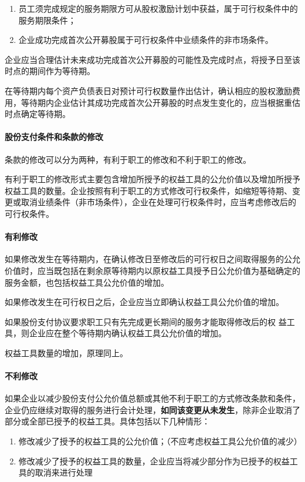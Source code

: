 \documentclass[UTF8,12pt]{ctexart}
\numberwithin{equation}{section} %
\numberwithin{figure}{section}
\numberwithin{table}{section}
\begin{document}
	\begin{enumerate}
		\item 员工须完成规定的服务期限方可从股权激励计划中获益，属于可行权条件中的服务期限条件；
		
		\item 企业成功完成首次公开募股属于可行权条件中业绩条件的非市场条件。
	\end{enumerate}

	企业应当合理估计未来成功完成首次公开募股的可能性及完成时点，将授予日至该时点的期间作为等待期。
	
	在等待期内每个资产负债表日对预计可行权数量作出估计，确认相应的股权激励费用，等待期内企业估计其成功完成首次公开募股的时点发生变化的，应当根据重估时点确定等待期。
	
	\paragraph{股份支付条件和条款的修改}
	条款的修改可以分为两种，有利于职工的修改和不利于职工的修改。
	
	有利于职工的修改形式主要包含增加所授予的权益工具的公允价值以及增加所授予权益工具的数量。企业按照有利于职工的方式修改可行权条件，如缩短等待期、变更或取消业绩条件（非市场条件），企业在处理可行权条件时，应当考虑修改后的可行权条件。
	
	\paragraph{有利修改}
	如果修改发生在等待期内，在确认修改日至修改后的可行权日之间取得服务的公允价值时，应当既包括在剩余原等待期内以原权益工具授予日公允价值为基础确定的服务金额，也包括权益工具公允价值的增加。
	
	如果修改发生在可行权日之后，企业应当立即确认权益工具公允价值的增加。
	
	如果股份支付协议要求职工只有先完成更长期间的服务才能取得修改后的权  益工具，则企业应在整个等待期内确认权益工具公允价值的增加。
	
	权益工具数量的增加，原理同上。
	
	\paragraph{不利修改}
	如果企业以减少股份支付公允价值总额或其他不利于职工的方式修改条款和条件，企业仍应继续对取得的服务进行会计处理，\textbf{如同该变更从未发生}，除非企业取消了部分或全部已授予的权益工具。具体包括以下几种情形：
	\begin{enumerate}
		\item 修改减少了授予的权益工具的公允价值；（不应考虑权益工具公允价值的减少）
		
		\item 修改减少了授予的权益工具的数量，企业应当将减少部分作为已授予的权益工具的取消来进行处理
	\end{enumerate}
	
\end{document}
